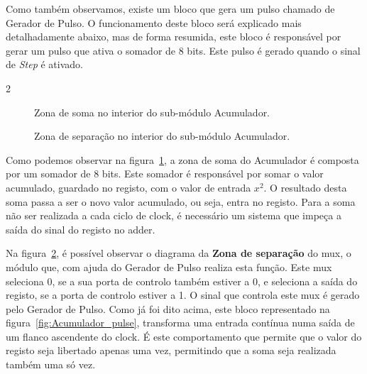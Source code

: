 Como também observamos, existe um bloco que gera um pulso chamado de Gerador de Pulso. O funcionamento deste bloco será explicado mais detalhadamente abaixo, mas de forma resumida, este bloco é responsável por gerar um pulso que ativa o somador de 8 bits. Este pulso é gerado quando o sinal de \textit{Step} é ativado.

\begin{multicols}{2}
    \noindent
    \begin{minipage}[b]{0.5\textwidth}
        \begin{figure}[H]
            \centering
            
            \caption{Zona de soma no interior do sub-módulo Acumulador.}\label{fig:Acumulador_adder}
        \end{figure}
    \end{minipage}\begin{minipage}[b]{0.5\textwidth}
        \begin{figure}[H]
            \centering
            
            \caption{Zona de separação no interior do sub-módulo Acumulador.}\label{fig:Acumulador_mux}
        \end{figure}
    \end{minipage}
\end{multicols}

Como podemos observar na figura~\ref{fig:Acumulador_adder}, a zona de soma do Acumulador é composta por um somador de 8 bits. Este somador é responsável por somar o valor acumulado, guardado no registo, com o valor de entrada $x^2$. O resultado desta soma passa a ser o novo valor acumulado, ou seja, entra no registo. Para a soma não ser realizada a cada ciclo de \Gls{clock}, é necessário um sistema que impeça a saída do sinal do registo no adder.

Na figura~\ref{fig:Acumulador_mux}, é possível observar o diagrama da \textbf{Zona de separação} do \gls{mux}, o módulo que, com ajuda do Gerador de Pulso realiza esta função. Este \Gls{mux} seleciona 0, se a sua porta de controlo também estiver a 0, e seleciona a saída do registo, se a porta de controlo estiver a 1. O sinal que controla este \Gls{mux} é gerado pelo Gerador de Pulso. Como já foi dito acima, este bloco representado na figura~\ref{fig:Acumulador_pulse}, transforma uma entrada contínua numa saída de um flanco ascendente do \Gls{clock}. É este comportamento que permite que o valor do registo seja libertado apenas uma vez, permitindo que a soma seja realizada também uma só vez.

